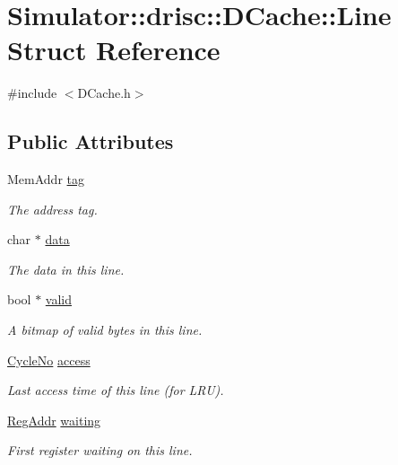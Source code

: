 \hypertarget{struct_simulator_1_1drisc_1_1_d_cache_1_1_line}{\section{Simulator\+:\+:drisc\+:\+:D\+Cache\+:\+:Line Struct Reference}
\label{struct_simulator_1_1drisc_1_1_d_cache_1_1_line}
}


{\ttfamily \#include $<$D\+Cache.\+h$>$}

\subsection*{Public Attributes}
\begin{DoxyCompactItemize}
\item 
Mem\+Addr \hyperlink{struct_simulator_1_1drisc_1_1_d_cache_1_1_line_ae479013da253922204974b2bef006dee}{tag}
\begin{DoxyCompactList}\small\item\em The address tag. \end{DoxyCompactList}\item 
char $\ast$ \hyperlink{struct_simulator_1_1drisc_1_1_d_cache_1_1_line_ad7f38360a631034f0f593998abf0bc1b}{data}
\begin{DoxyCompactList}\small\item\em The data in this line. \end{DoxyCompactList}\item 
bool $\ast$ \hyperlink{struct_simulator_1_1drisc_1_1_d_cache_1_1_line_aee0ce0d4a531af641df200d47178953a}{valid}
\begin{DoxyCompactList}\small\item\em A bitmap of valid bytes in this line. \end{DoxyCompactList}\item 
\hyperlink{namespace_simulator_a928f1e2101eba21bb0fe409e8c9ce573}{Cycle\+No} \hyperlink{struct_simulator_1_1drisc_1_1_d_cache_1_1_line_a31cbd7df0f708bf01b5bf1a8a878b48c}{access}
\begin{DoxyCompactList}\small\item\em Last access time of this line (for L\+R\+U). \end{DoxyCompactList}\item 
\hyperlink{struct_simulator_1_1_reg_addr}{Reg\+Addr} \hyperlink{struct_simulator_1_1drisc_1_1_d_cache_1_1_line_ad647618b60b3ee202afc191e1076f279}{waiting}
\begin{DoxyCompactList}\small\item\em First register waiting on this line. \end{DoxyCompactList}\item 

\end{DoxyCompactItemize}
